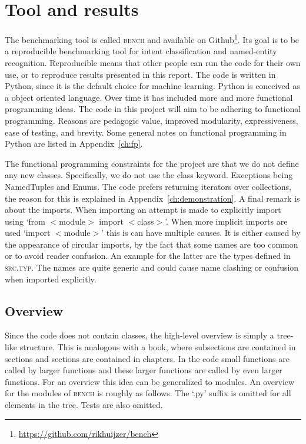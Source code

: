 \section{Tool and results}
\label{sec:bench}
The benchmarking tool is called \textsc{bench} and available on Github\footnote{\url{https://github.com/rikhuijzer/bench}}.
Its goal is to be a reproducible benchmarking tool for intent classification and named-entity recognition.
Reproducible means that other people can run the code for their own use, or to reproduce results presented in this report.
The code is written in Python, since it is the default choice for machine learning.
Python is conceived as a object oriented language.
Over time it has included more and more functional programming ideas.
The code in this project will aim to be adhering to functional programming.
Reasons are pedagogic value, improved modularity, expressiveness, ease of testing, and brevity.
Some general notes on functional programming in Python are listed in Appendix~\ref{ch:fp}.

The functional programming constraints for the project are that we do not define any new classes.
Specifically, we do not use the class keyword.
Exceptions being NamedTuples and Enums.
The code prefers returning iterators over collections, the reason for this is explained in Appendix~\ref{ch:demonstration}.
A final remark is about the imports.
When importing an attempt is made to explicitly import using `from $<$module$>$ import $<$class$>$'.
When more implicit imports are used `import $<$module$>$' this is can have multiple causes.
It is either caused by the appearance of circular imports, by the fact that some names are too common or to avoid reader confusion.
An example for the latter are the types defined in \textsc{src.typ}.
The names are quite generic and could cause name clashing or confusion when imported explicitly.

\subsection{Overview}
\label{subsec:overview}
Since the code does not contain classes, the high-level overview is simply a tree-like structure.
This is analogous with a book, where subsections are contained in sections and sections are contained in chapters.
In the code small functions are called by larger functions and these larger functions are called by even larger functions.
For an overview this idea can be generalized to modules.
An overview for the modules of \textsc{bench} is roughly as follows.
The `.py' suffix is omitted for all elements in the tree.
Tests are also omitted.

